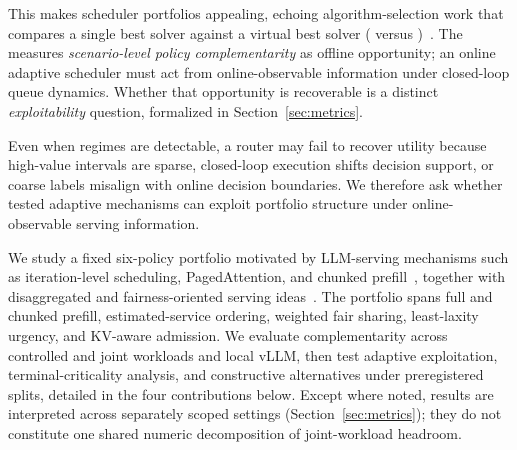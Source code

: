 \documentclass[runningheads]{llncs}
\begin{document}
This makes scheduler portfolios appealing, echoing algorithm-selection work
that compares a single best solver against a virtual best solver
(\sbs{} versus \vbs{})~\cite{rice1976algorithmselection,gomes2001portfolios,satzilla2008,autofolio2015}.
The \vbs{} measures \emph{scenario-level policy complementarity} as offline
opportunity; an online adaptive scheduler must act from online-observable
information under closed-loop queue dynamics. Whether that opportunity is
recoverable is a distinct \emph{exploitability} question, formalized in
Section~\ref{sec:metrics}.

Even when regimes are detectable, a router may fail to recover utility because
high-value intervals are sparse, closed-loop execution shifts decision support,
or coarse labels misalign with online decision boundaries. We therefore ask
whether tested adaptive mechanisms can exploit portfolio structure under
online-observable serving information.

We study a fixed six-policy portfolio motivated by LLM-serving mechanisms such
as iteration-level scheduling, PagedAttention, and chunked
prefill~\cite{orca2022,vllm2023,sarathi2024}, together with disaggregated and
fairness-oriented serving ideas~\cite{distserve2024,vtc2024}.
The portfolio spans full and chunked prefill, estimated-service ordering,
weighted fair sharing, least-laxity urgency, and KV-aware admission. We
evaluate complementarity across controlled and joint workloads and local
vLLM, then test adaptive exploitation, terminal-criticality analysis, and
constructive alternatives under preregistered splits, detailed in the four
contributions below. Except where noted, results are interpreted across
separately scoped settings (Section~\ref{sec:metrics}); they do not constitute
one shared numeric decomposition of joint-workload headroom.
\end{document}
